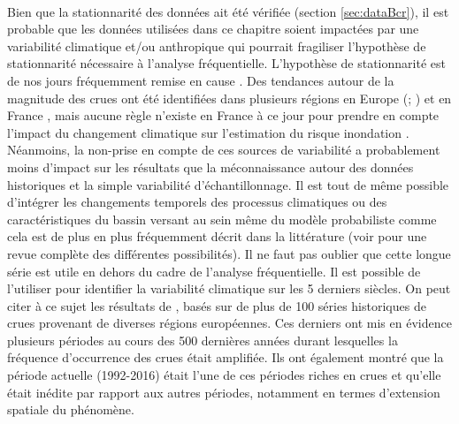 	\paragraph{} Bien que la stationnarité des données ait été vérifiée (section \ref{sec:dataBcr}), il est probable que les données utilisées dans ce chapitre soient impactées par une variabilité climatique et/ou anthropique qui pourrait fragiliser l'hypothèse de stationnarité nécessaire à l'analyse fréquentielle. L'hypothèse de stationnarité est de nos jours fréquemment remise en cause \citep{milly_stationarity_2008}. Des tendances autour de la magnitude des crues ont été identifiées dans plusieurs régions en Europe (\cite{hall_understanding_2014}; \cite{bloschl_changing_2019}) et en France \citep{giuntoli_floods_2019}, mais aucune règle n'existe en France à ce jour pour prendre en compte l'impact du changement climatique sur l'estimation du risque inondation \citep{madsen_review_2014}. Néanmoins, la non-prise en compte de ces sources de variabilité a probablement moins d'impact sur les résultats que la méconnaissance autour des données historiques et la simple variabilité d'échantillonnage. Il est tout de même possible d'intégrer les changements temporels des processus climatiques ou des caractéristiques du bassin versant au sein même du modèle probabiliste comme cela est de plus en plus fréquemment décrit dans la littérature (voir \citet{salas_techniques_2018} pour une revue complète des différentes possibilités). Il ne faut pas oublier que cette longue série est utile en dehors du cadre de l'analyse fréquentielle. Il est possible de l'utiliser pour identifier la variabilité climatique sur les 5 derniers siècles. On peut citer à ce sujet les résultats de \citet{bloschl_current_2020}, basés sur de plus de 100 séries historiques de crues provenant de diverses régions européennes. Ces derniers ont mis en évidence plusieurs périodes au cours des 500 dernières années durant lesquelles la fréquence d'occurrence des crues était amplifiée. Ils ont également montré que la période actuelle (1992-2016) était l'une de ces périodes riches en crues et qu'elle était inédite par rapport aux autres périodes, notamment en termes d'extension spatiale du phénomène. 
	
	
